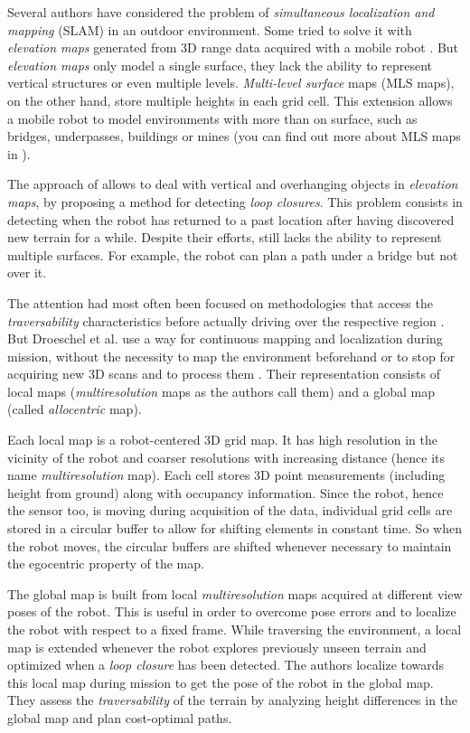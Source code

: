 \documentclass[12pt,a4paper]{report}
\newcommand{\etal}[1]{#1 et al.}
\newcommand{\term}{\textit}
\newcommand{\acronym}{\MakeUppercase}
\begin{document}
	Several authors have considered the problem of \term{simultaneous localization 
	and mapping} (\acronym{slam}) in an outdoor environment. Some tried to solve it 
	with \term{elevation maps} generated from \acronym{3d} range data acquired with a 
	mobile robot \cite{Pfaff}. But \term{elevation maps} only model a single surface, 
	they lack the ability to represent vertical structures or even multiple levels.
	\term{Multi-level surface} maps (\acronym{mls} maps), on the other hand, store 
	multiple heights in each grid cell. This extension allows a mobile robot to model 
	environments with more than on surface, such as bridges, underpasses, buildings 
	or mines (you can find out more about \acronym{mls} maps in \cite{Triebel}). 
	\par
	The approach of \cite{Pfaff} allows to deal with vertical and overhanging objects 
	in \term{elevation maps}, by proposing a method for detecting \term{loop closures}. 
	This problem consists in detecting when the robot has returned to a past location 
	after having discovered new terrain for a while. Despite their efforts, 
	\cite{Pfaff} still lacks the ability to represent multiple surfaces. For example, 
	the robot can plan a path under a bridge but not over it.
	\par
	The attention had most often been focused on methodologies that access the 
	\term{traversability} characteristics before actually driving over the respective 
	region \cite{Papadakis}. But \etal{Droeschel} use a way for continuous mapping 
	and localization during mission, without the necessity to map the environment 
	beforehand or to stop for acquiring new \acronym{3d} scans and to process them 
	\cite{Droeschel}. Their representation consists of local maps (\term{multiresolution} 
	maps as the authors call them) and a global map (called \term{allocentric} map).
	\par
	Each local map is a robot-centered \acronym{3d} grid map. It has high resolution 
	in the vicinity of the robot and coarser resolutions with increasing distance 
	(hence its name \term{multiresolution} map). Each cell stores \acronym{3d} point 
	measurements (including height from ground) along with occupancy information. 
	Since the robot, hence the sensor too, is moving during acquisition of the data, 
	individual grid cells are stored in a circular buffer to allow for shifting 
	elements in constant time. So when the robot moves, the circular buffers are 
	shifted whenever necessary to maintain the egocentric property of the map.
	\par
	The global map is built from local \term{multiresolution} maps acquired at different 
	view poses of the robot. This is useful in order to overcome pose errors and to 
	localize the robot with respect to a fixed frame. While traversing the environment, 
	a local map is extended whenever the robot explores previously unseen terrain 
	and optimized when a \term{loop closure} has been detected. The authors localize 
	towards this local map during mission to get the pose of the robot in the global 
	map. They assess the \term{traversability} of the terrain by analyzing height 
	differences in the global map and plan cost-optimal paths.
	\\
	
\end{document}
